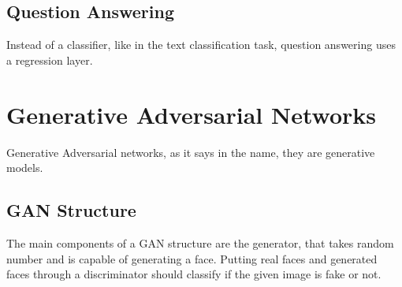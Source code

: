 \documentclass{article}
\begin{document}
\subsection*{Question Answering}
Instead of a classifier, like in the text classification task, question answering uses a regression layer.

\section{Generative Adversarial Networks}
Generative Adversarial networks, as it says in the name, they are generative models.
\subsection*{GAN Structure}
The main components of a GAN structure are the generator, that takes random number and is capable of generating a face. Putting real faces and generated faces through a discriminator should classify if the given image is fake or not. 



\end{document}
